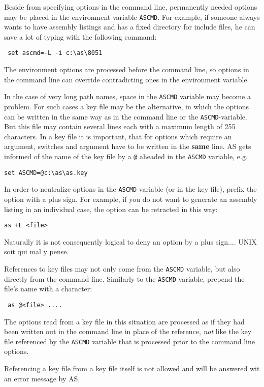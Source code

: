 \documentclass[12pt,twoside]{report}
\newcommand{\bb}[1]{{\bf #1}}
\newcommand{\tty}[1]{{\tt #1}}
\newcommand{\asname}{{AS}}
\begin{document}
Beside from specifying options in the command line, permanently
needed options may be placed in the environment variable \tty{ASCMD}.  For
example, if someone always wants to have assembly listings and has a
fixed directory for include files, he can save a lot of typing with
the following command:
\begin{verbatim}
 set ascmd=-L -i c:\as\8051
\end{verbatim}
The environment options are processed before the command line,
so options in the command line can override contradicting ones in the
environment variable.

In the case of very long path names, space in the \tty{ASCMD} variable may
become a problem.  For such cases a key file may be the alternative,
in which the options can be written in the same way as in the command
line or the \tty{ASCMD}-variable.  But this file may contain several lines
each with a maximum length of 255 characters.  In a key file it is
important, that for options which require an argument, switches and
argument have to be written in the \bb{same} line.  \asname{} gets informed of
the name of the key file by a \tty{@} aheaded in the \tty{ASCMD} variable,
e.g.
\begin{verbatim}
set ASCMD=@c:\as\as.key
\end{verbatim}
In order to neutralize options in the \tty{ASCMD} variable (or in the
key file), prefix the option with a plus sign.  For example, if you
do not want to generate an assembly listing in an individual case,
the option can be retracted in this way:
\begin{verbatim}
as +L <file>
\end{verbatim}
Naturally it is not consequently logical to deny an option by a
plus sign....  UNIX soit qui mal y pense.

References to key files may not only come from the {\tt ASCMD} variable,
but also directly from the command line.  Similarly to the {\tt ASCMD}
variable, prepend the file's name with a \@ character:
\begin{verbatim}
 as @<file> ....
\end{verbatim}
The options read from a key file in this situation are processed as if
they had been written out in the command line in place of the reference,
{\em not} like the key file referenced by the {\tt ASCMD} variable that is
processed prior to the command line options.

Referencing a key file from a key file itself is not allowed and will be
answered wit an error message by \asname{}.
\end{document}

